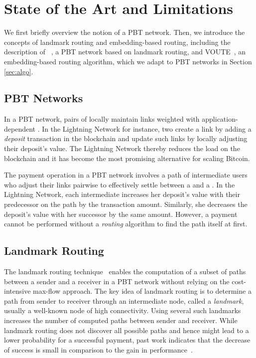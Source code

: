 \section{State of the Art and Limitations}
\label{sec:background}

We first briefly overview the notion of a PBT network. 
Then, we introduce the concepts of landmark routing and embedding-based routing, including the description 
of \cnsysname~\cite{malavolta17silent}, a PBT network based on landmark routing, and VOUTE~\cite{roos2016anonymous}, an embedding-based routing algorithm, which we adapt to PBT networks in Section \ref{sec:algo}. 

\subsection{PBT Networks}
In a PBT network, pairs of \emph{\users} locally maintain links weighted with 
application-dependent \emph{\money}. In the Lightning Network for instance, 
two \users create a link by adding a \emph{deposit} transaction in the blockchain 
and update such links by locally adjusting their deposit's value. 
The Lightning Network thereby reduces the load on the blockchain and 
it has become the most promising alternative for scaling Bitcoin. 

The payment operation in a PBT network involves a path of intermediate users 
who adjust their links pairwise to effectively settle \money between a \sender and a \receiver. 
In the Lightning Network, each intermediate \user increases her deposit's value
with 
their predecessor on the path by the transaction amount. 
Similarly, she decreases the deposit's value 
with her successor by the same amount. However, 
a payment cannot be performed without a \emph{routing} algorithm to find the path itself at first.

\subsection{Landmark Routing}

The landmark routing technique~\cite{tsuchiya1988landmark} enables the computation of 
a subset of paths between a sender and a receiver in a PBT network without relying
on the cost-intensive max-flow approach.
The key idea of landmark routing is to determine a path from sender to receiver through 
an intermediate node, called a \emph{landmark}, usually a well-known node of high connectivity. 
Using several such landmarks increases the number of computed paths between sender and receiver.
While landmark routing does not discover all possible paths and hence might lead to a lower
probability for a successful payment, past work indicates that the decrease of success is small
in comparison to the gain in performance~\cite{viswanath2012canal,moreno15privpay}.

